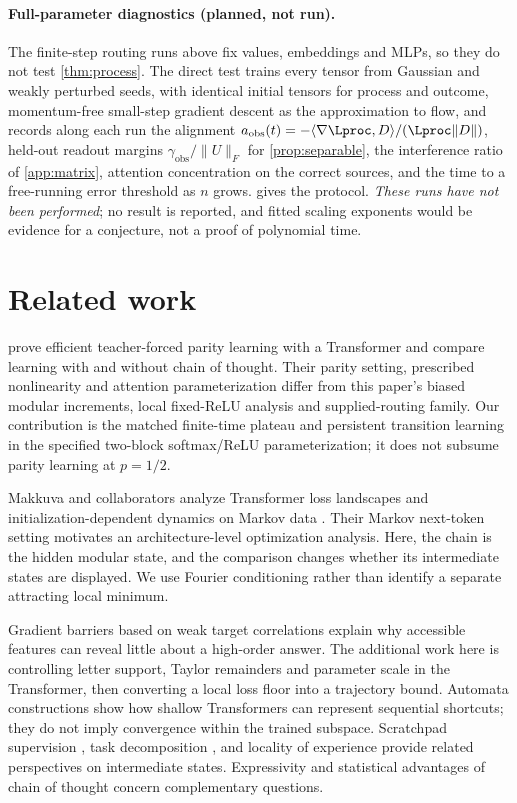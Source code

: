 \paragraph{Full-parameter diagnostics (planned, not run).}
The finite-step routing runs above fix values, embeddings and MLPs, so they do not test \cref{thm:process}. The direct test trains every tensor from Gaussian and weakly perturbed seeds, with identical initial tensors for process and outcome, momentum-free small-step gradient descent as the approximation to flow, and records along each run the alignment $a_{\mathrm{obs}}(t)=-\langle\nabla\Lproc,D\rangle/(\Lproc\|D\|)$, held-out readout margins $\gamma_{\mathrm{obs}}/\|U\|_F$ for \cref{prop:separable}, the interference ratio of \cref{app:matrix}, attention concentration on the correct sources, and the time to a free-running error threshold as $n$ grows.  gives the protocol. \emph{These runs have not been performed}; no result is reported, and fitted scaling exponents would be evidence for a conjecture, not a proof of polynomial time.

\section{Related work}\label{sec:related}
\citet{kim2024parity} prove efficient teacher-forced parity learning with a Transformer and compare learning with and without chain of thought. Their parity setting, prescribed nonlinearity and attention parameterization differ from this paper's biased modular increments, local fixed-ReLU analysis and supplied-routing family. Our contribution is the matched finite-time plateau and persistent transition learning in the specified two-block softmax/ReLU parameterization; it does not subsume parity learning at $p=1/2$.

Makkuva and collaborators analyze Transformer loss landscapes and initialization-dependent dynamics on Markov data \citep{makkuva2025attention,makkuva2024local}. Their Markov next-token setting motivates an architecture-level optimization analysis. Here, the chain is the hidden modular state, and the comparison changes whether its intermediate states are displayed. We use Fourier conditioning rather than identify a separate attracting local minimum.

Gradient barriers based on weak target correlations \citep{shalevshwartz2017failures,abbe2025parities} explain why accessible features can reveal little about a high-order answer. The additional work here is controlling letter support, Taylor remainders and parameter scale in the Transformer, then converting a local loss floor into a trajectory bound. Automata constructions \citep{liu2023automata} show how shallow Transformers can represent sequential shortcuts; they do not imply convergence within the trained subspace. Scratchpad supervision \citep{nye2021scratchpads}, task decomposition \citep{wies2023subtask}, and locality of experience \citep{prystawski2023think} provide related perspectives on intermediate states. Expressivity and statistical advantages of chain of thought \citep{merrill2024expressive,wen2024sparse} concern complementary questions.


